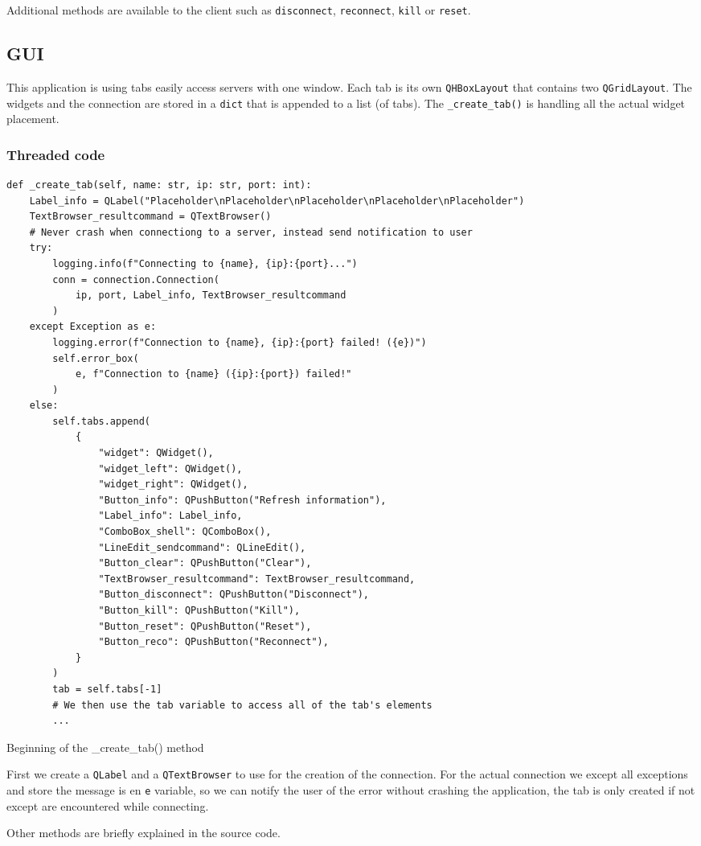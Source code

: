 \documentclass{article}
\begin{document}
Additional methods are available to the client such as \verb|disconnect|,
\verb|reconnect|, \verb|kill| or \verb|reset|.

\subsection{GUI}
This application is using tabs easily access servers with one window. Each tab
is its own \verb|QHBoxLayout| that contains two \verb|QGridLayout|. The widgets
and the connection are stored in a \verb|dict| that is appended to a list (of
tabs). The \verb|_create_tab()| is handling all the actual widget placement.

\subsubsection{Threaded code}
\begin{listing}[H]
    \begin{verbatim}
def _create_tab(self, name: str, ip: str, port: int):
    Label_info = QLabel("Placeholder\nPlaceholder\nPlaceholder\nPlaceholder\nPlaceholder")
    TextBrowser_resultcommand = QTextBrowser()
    # Never crash when connectiong to a server, instead send notification to user
    try:
        logging.info(f"Connecting to {name}, {ip}:{port}...")
        conn = connection.Connection(
            ip, port, Label_info, TextBrowser_resultcommand
        )
    except Exception as e:
        logging.error(f"Connection to {name}, {ip}:{port} failed! ({e})")
        self.error_box(
            e, f"Connection to {name} ({ip}:{port}) failed!"
        )
    else:
        self.tabs.append(
            {
                "widget": QWidget(),
                "widget_left": QWidget(),
                "widget_right": QWidget(),
                "Button_info": QPushButton("Refresh information"),
                "Label_info": Label_info,
                "ComboBox_shell": QComboBox(),
                "LineEdit_sendcommand": QLineEdit(),
                "Button_clear": QPushButton("Clear"),
                "TextBrowser_resultcommand": TextBrowser_resultcommand,
                "Button_disconnect": QPushButton("Disconnect"),
                "Button_kill": QPushButton("Kill"),
                "Button_reset": QPushButton("Reset"),
                "Button_reco": QPushButton("Reconnect"),
            }
        )
        tab = self.tabs[-1]
        # We then use the tab variable to access all of the tab's elements
        ...
    \end{verbatim}
    \caption{Beginning of the \_create\_tab() method}
    \label{client:createtab}
\end{listing}

First we create a \verb|QLabel| and a \verb|QTextBrowser| to use for the
creation of the connection. For the actual connection we except all exceptions
and store the message is en \verb|e| variable, so we can notify the user of the
error without crashing the application, the tab is only created if not except
are encountered while connecting.

Other methods are briefly explained in the source code.
\end{document}
